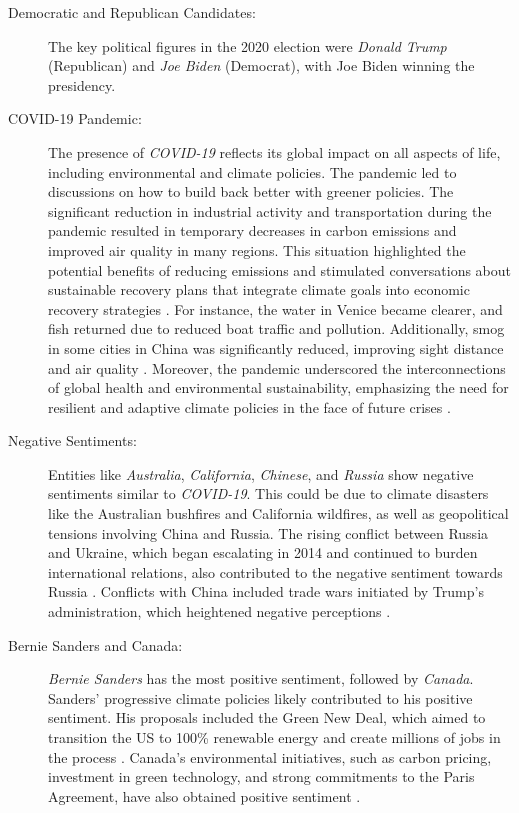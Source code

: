 \begin{description}
    \item[Democratic and Republican Candidates:] The key political figures in the 2020 election were \emph{Donald Trump} (Republican) and \emph{Joe Biden} (Democrat), with Joe Biden winning the presidency.
    \item[COVID-19 Pandemic:] The presence of \emph{COVID-19} reflects its global impact on all aspects of life, including environmental and climate policies. The pandemic led to discussions on how to build back better with greener policies. The significant reduction in industrial activity and transportation during the pandemic resulted in temporary decreases in carbon emissions and improved air quality in many regions. This situation highlighted the potential benefits of reducing emissions and stimulated conversations about sustainable recovery plans that integrate climate goals into economic recovery strategies \cite{JABAREEN2013220}. For instance, the water in Venice became clearer, and fish returned due to reduced boat traffic and pollution. Additionally, smog in some cities in China was significantly reduced, improving sight distance and air quality \cite{Xu_2020}. Moreover, the pandemic underscored the interconnections of global health and environmental sustainability, emphasizing the need for resilient and adaptive climate policies in the face of future crises \cite{interdisciplinary2021}.
    \item[Negative Sentiments:] Entities like \emph{Australia}, \emph{California}, \emph{Chinese}, and \emph{Russia} show negative sentiments similar to \emph{COVID-19}. This could be due to climate disasters like the Australian bushfires and California wildfires, as well as geopolitical tensions involving China and Russia. The rising conflict between Russia and Ukraine, which began escalating in 2014 and continued to burden international relations, also contributed to the negative sentiment towards Russia \cite{crisisgroup2022donbas}. Conflicts with China included trade wars initiated by Trump's administration, which heightened negative perceptions \cite{doi:10.1177/17480485231206364}.
    \item[Bernie Sanders and Canada:] \emph{Bernie Sanders} has the most positive sentiment, followed by \emph{Canada}. Sanders' progressive climate policies likely contributed to his positive sentiment. His proposals included the Green New Deal, which aimed to transition the US to 100\% renewable energy and create millions of jobs in the process \cite{sanders2020green}. Canada's environmental initiatives, such as carbon pricing, investment in green technology, and strong commitments to the Paris Agreement, have also obtained positive sentiment \cite{canada2020climate}.
\end{description}

